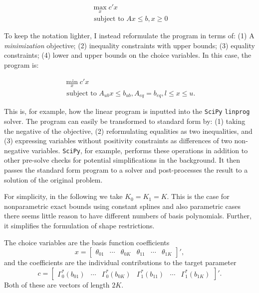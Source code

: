 \documentclass[12pt,a4paper,english]{article} %
\numberwithin{equation}{section}
\theoremstyle{definition}
\theoremstyle{remark}
\theoremstyle{plain}
\begin{document}
\begin{align}
  \max_x c'x \\
  \text{ subject to } Ax\leq b, x\geq0
\end{align}

To keep the notation lighter, I instead reformulate the program in terms of:
(1) A \textit{minimization} objective; (2) inequality constraints with upper bounds; (3) equality constraints; (4) lower and upper bounds on the choice variables.
In this case, the program is:

\begin{align}
  \min_x c'x \\
  \text{ subject to } A_{ub}x \leq b_{ub}, A_{eq} = b_{eq}, l\leq x\leq u.
\end{align}

This is, for example, how the linear program is inputted into the \texttt{SciPy} \texttt{linprog} solver.
The program can easily be transformed to standard form by: (1) taking the negative of the objective, (2) reformulating equalities as two inequalities, and (3) expressing variables without positivity constraints as differences of two non-negative variables.
\texttt{SciPy}, for example, performs these operations in addition to other pre-solve checks for potential simplifications in the background.
It then passes the standard form program to a solver and post-processes the result to a solution of the original problem.

For simplicity, in the following we take $K_0 = K_1 = K$. This is the case for nonparametric exact bounds using constant splines and also parametric cases there seems little reason to have different numbers of basis polynomials.
Further, it simplifies the formulation of shape restrictions.

The choice variables are the basis function coefficients
\begin{equation*}
  x =
  \begin{bmatrix}
     \theta_{01} & \cdots & \theta_{0K} & \theta_{11} & \cdots & \theta_{1K}
  \end{bmatrix}',
\end{equation*}
and the coefficients are the individual contributions to the target parameter
\begin{equation*}
  c =
  \begin{bmatrix}
     \Gamma_0^*(b_{01}) & \cdots & \Gamma_0^*(b_{0K}) & \Gamma_1^*(b_{11}) & \cdots & \Gamma_1^*(b_{1K})
  \end{bmatrix}'.
\end{equation*}
Both of these are vectors of length $2K$.
\end{document}
